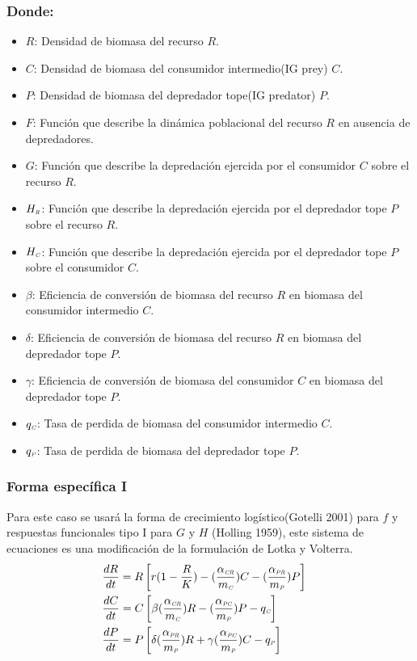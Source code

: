 \documentclass[a4paper,11pt]{article}
\newcommand{\PP}{\textit{\tiny P}}
\newcommand{\C}{\textit{\tiny C}}
\newcommand{\R}{\textit{\tiny R}}
\newcommand{\CR}{\textit{\tiny CR}}
\newcommand{\PC}{\textit{\tiny PC}}
\newcommand{\PR}{\textit{\tiny PR}}
\begin{document}
\subsubsection*{Donde:}
\begin{itemize}
\item[]$R$: Densidad de biomasa del recurso $R$.
\item[]$C$: Densidad de biomasa del consumidor intermedio(IG prey) $C$.
\item[]$P$: Densidad de biomasa del depredador tope(IG predator) $P$.
\item[]$F$: Funci\'on que describe la din\'amica poblacional del recurso $R$ en ausencia de depredadores.
\item[]$G$: Funci\'on que describe la depredaci\'on ejercida por el consumidor $C$ sobre el recurso $R$.
\item[]$H_{\R}$: Funci\'on que describe la depredaci\'on ejercida por el depredador tope $P$ sobre el recurso $R$.
\item[]$H_{\C}$: Funci\'on que describe la depredaci\'on ejercida por el depredador tope $P$ sobre el consumidor $C$.
\item[]$\beta$: Eficiencia de conversi\'on de biomasa del recurso $R$ en biomasa del consumidor intermedio $C$.
\item[]$\delta$: Eficiencia de conversi\'on de biomasa del recurso $R$ en biomasa del depredador tope $P$.
\item[]$\gamma$: Eficiencia de conversi\'on de biomasa del consumidor $C$ en biomasa del depredador tope $P$.
\item[]$q_{\C}$: Tasa de perdida de biomasa del consumidor intermedio $C$.
\item[]$q_{\textit{\tiny P}}$: Tasa de perdida de biomasa del depredador tope $P$.
\end{itemize}
\subsubsection*{Forma espec\'ifica I}
Para este caso se usar\'a la forma de crecimiento log\'istico(Gotelli 2001) para $f$ y respuestas funcionales tipo I para $G$ y $H$ (Holling 1959), este sistema de ecuaciones es una modificaci\'on de la formulaci\'on de Lotka y Volterra.
\begin{align}
&\frac{dR}{dt} = R \left[ r(1-\frac{R}{K}) -(\frac{\alpha_{\CR}}{m_\C})C-(\frac{\alpha_{\PR}}{m_\textit{\tiny P}})P \right] &\\
&\frac{dC}{dt} = C \left[ \beta(\frac{\alpha_{\CR}}{m_\C})R-(\frac{\alpha_{\PC}}{m_\PP})P -q_{\C}  \right]\\
&\frac{dP}{dt} = P \left[ \delta (\frac{\alpha_{\PR}}{m_\PP})R  +\gamma (\frac{\alpha_{\PC}}{m_\PP})C-q_{\PP} \right]
\end{align}
\end{document}
